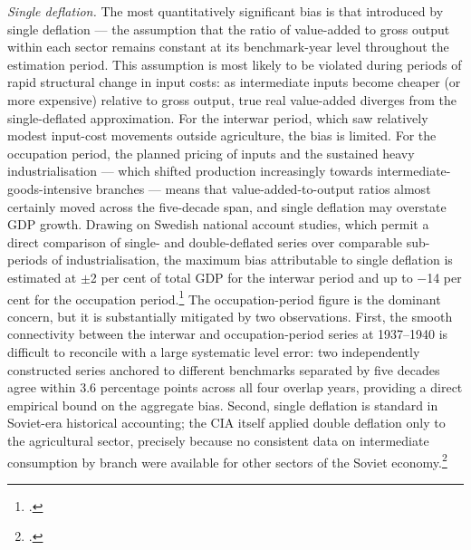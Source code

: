 \documentclass[12pt,a4paper]{article}
\begin{document}
\textit{Single deflation.} The most quantitatively significant bias is that introduced by single deflation — the assumption that the ratio of value-added to gross output within each sector remains constant at its benchmark-year level throughout the estimation period. This assumption is most likely to be violated during periods of rapid structural change in input costs: as intermediate inputs become cheaper (or more expensive) relative to gross output, true real value-added diverges from the single-deflated approximation. For the interwar period, which saw relatively modest input-cost movements outside agriculture, the bias is limited. For the occupation period, the planned pricing of inputs and the sustained heavy industrialisation — which shifted production increasingly towards intermediate-goods-intensive branches — means that value-added-to-output ratios almost certainly moved across the five-decade span, and single deflation may overstate GDP growth. Drawing on Swedish national account studies, which permit a direct comparison of single- and double-deflated series over comparable sub-periods of industrialisation, the maximum bias attributable to single deflation is estimated at $\pm$2 per cent of total GDP for the interwar period and up to $-$14 per cent for the occupation period.\footnote{\autocite[19]{swedengdp_15602010}.} The occupation-period figure is the dominant concern, but it is substantially mitigated by two observations. First, the smooth connectivity between the interwar and occupation-period series at 1937--1940 is difficult to reconcile with a large systematic level error: two independently constructed series anchored to different benchmarks separated by five decades agree within 3.6 percentage points across all four overlap years, providing a direct empirical bound on the aggregate bias. Second, single deflation is standard in Soviet-era historical accounting; the CIA itself applied double deflation only to the agricultural sector, precisely because no consistent data on intermediate consumption by branch were available for other sectors of the Soviet economy.\footnote{\autocite[45]{cia1982a}.}
\end{document}
